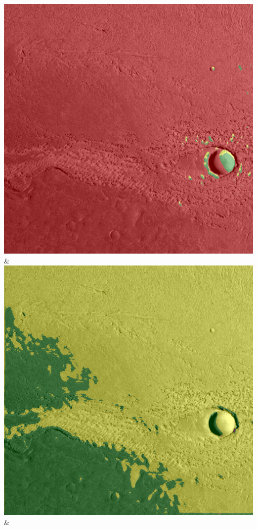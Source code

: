 \begin{table}[h!]
\begin{tabularx}{\textwidth}
		\includegraphics[width=0.9\linewidth]{images/gen/number_of_segments/p03_02.png_5.png} &
		\includegraphics[width=0.9\linewidth]{images/gen/number_of_segments/p03_02.png_10.png} &

\end{tabularx}
\end{table}
